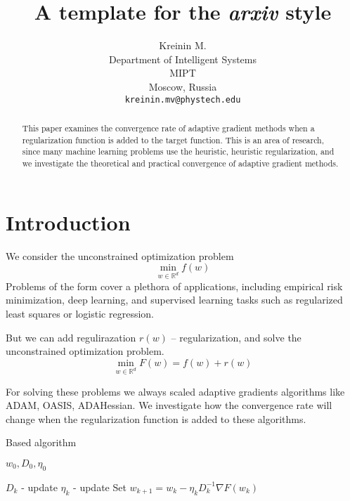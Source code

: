 \documentclass{article}
\title{A template for the \emph{arxiv} style}
\author{ Kreinin M. \\
	Department of Intelligent Systems\\
	MIPT\\
	Moscow, Russia \\
	\texttt{kreinin.mv@phystech.edu} \\
}
\date{}
\begin{document}
\maketitle

\begin{abstract}
	This paper examines the convergence rate of adaptive gradient methods when a regularization function is added to the target function. This is an area of research, since many machine learning problems use the heuristic, heuristic regularization, and we investigate the theoretical and practical convergence of adaptive gradient methods.

\end{abstract}


\section{Introduction}
We consider the unconstrained optimization problem
\begin{equation*}
	\min_{w \in \mathbb{R}^d} f(w)
\end{equation*}
Problems of the form cover a plethora of applications, including empirical risk minimization,
deep learning, and supervised learning tasks such as regularized least squares or logistic regression.

But we can add regulirazation $r(w)$ -- regularization, and solve the unconstrained optimization problem.
\begin{equation*}
	\min_{w \in \mathbb{R}^d} F(w) = f(w) + r(w)
\end{equation*}

For solving these problems we always scaled adaptive gradients algorithms like ADAM, OASIS, ADAHessian. We investigate how the convergence rate will change when the regularization function is added to these algorithms.
\begin{algorithm}[H]
	\caption{Based algorithm}\label{alg:Based}
	$w_0, D_0, \eta_0$
	\begin{algorithmic}
		\State $D_k$ - update
		\State $\eta_k$ - update
		\State Set $w_{k+1} = w_k - \eta_k D_k^{-1} \nabla F(w_k)$
		\EndFor
	\end{algorithmic}
\end{algorithm}
\fi
\end{document}
